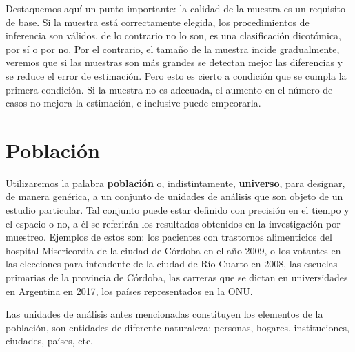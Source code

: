 \documentclass[]{book}
\begin{document}
Destaquemos aquí un punto importante: la calidad de la muestra es un requisito de base. Si la muestra está correctamente elegida, los procedimientos de inferencia son válidos, de lo contrario no lo son, es una clasificación dicotómica, por sí o por no. Por el contrario, el tamaño de la muestra incide gradualmente, veremos que si las muestras son más grandes se detectan mejor las diferencias y se reduce el error de estimación. Pero esto es cierto a condición que se cumpla la primera condición. Si la muestra no es adecuada, el aumento en el número de casos no mejora la estimación, e inclusive puede empeorarla.

\hypertarget{poblacion}{%
\section{Población}\label{poblacion}}

Utilizaremos la palabra \textbf{población} o, indistintamente, \textbf{universo},
para designar, de manera genérica, a un conjunto de unidades de análisis
que son objeto de un estudio particular. Tal conjunto puede estar
definido con precisión en el tiempo y el espacio o no, a él se referirán
los resultados obtenidos en la investigación por muestreo. Ejemplos de
estos son: los pacientes con trastornos alimenticios del hospital
Misericordia de la ciudad de Córdoba en el año 2009, o los votantes en
las elecciones para intendente de la ciudad de Río Cuarto en 2008, las
escuelas primarias de la provincia de Córdoba, las carreras que se
dictan en universidades en Argentina en 2017, los países representados en la ONU.

Las unidades de análisis antes mencionadas constituyen los elementos de la población, son entidades de diferente naturaleza: personas, hogares, instituciones, ciudades, países, etc.
\end{document}
